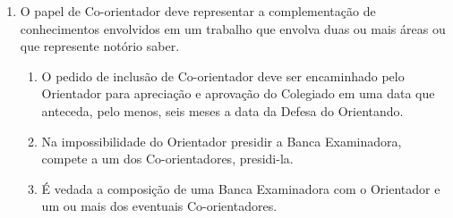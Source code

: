 \documentclass{article}
\newcommand{\grupoMenor}{Colegiado\xspace}
\begin{document}
\begin{enumerate}
	\item O papel de Co-orientador deve representar a complementação de conhecimentos envolvidos em um trabalho que envolva duas ou mais áreas ou que represente notório saber.
	\begin{enumerate}
		\item O pedido de inclusão de Co-orientador deve ser encaminhado pelo Orientador para apreciação e aprovação do \grupoMenor em uma data que anteceda, pelo menos, seis meses a data da Defesa do Orientando.
		\item Na impossibilidade do Orientador presidir a Banca Examinadora, compete a um dos Co-orientadores, presidi-la.
		\item É vedada a composição de uma Banca Examinadora com o Orientador e um ou mais dos eventuais Co-orientadores.
	\end{enumerate}

\end{enumerate}
\end{document}
